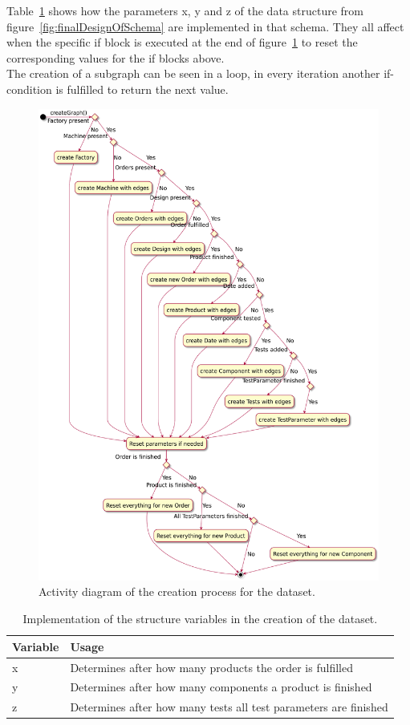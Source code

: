 Table~\ref{tab:recorderVariables} shows how the parameters x, y and z of the data structure from figure~\ref{fig:finalDesignOfSchema} are implemented in that schema.
They all affect when the specific if block is executed at the end of figure~\ref{fig:graphDataRecorder} to reset the corresponding values for the if blocks above.\\
The creation of a subgraph can be seen in a loop,
in every iteration another if-condition is fulfilled to return the next value.

\begin{figure}[h!]
  \centering
  \includegraphics[width=\textwidth]{images/extensions/GraphDataRecorder}
  \caption{Activity diagram of the creation process for the dataset.}
  \label{fig:graphDataRecorder}
\end{figure}

\begin{table}[h!]
  \begin{tabularx}{\textwidth}{ | l | X | }
    \hline
    Variable & Usage \\ \hline \hline
    x & Determines after how many products the order is fulfilled \\ \hline
    y & Determines after how many components a product is finished \\ \hline
    z & Determines after how many tests all test parameters are finished \\ \hline
  \end{tabularx}
  \caption{Implementation of the structure variables in the creation of the dataset.}
  \label{tab:recorderVariables}
\end{table}

